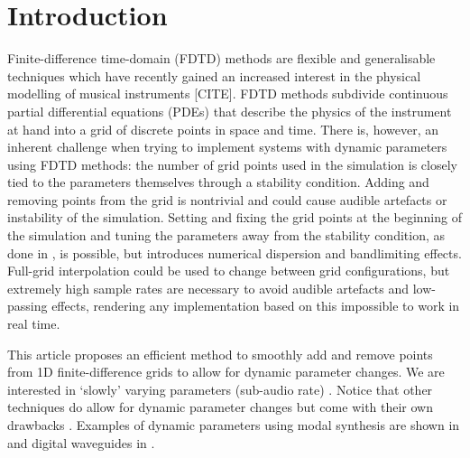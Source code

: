\section{Introduction}

Finite-difference time-domain (FDTD) methods are flexible and generalisable techniques which have recently gained an increased interest in the physical modelling of musical instruments [CITE]. %
FDTD methods subdivide continuous partial differential equations (PDEs) that describe the physics of the instrument at hand into a grid of discrete points in space and time. 
There is, however, an inherent challenge when trying to implement systems with dynamic parameters using FDTD methods: the number of grid points used in the simulation is closely tied to the parameters themselves through a stability condition.
Adding and removing points from the grid is nontrivial and could cause audible artefacts or instability of the simulation. Setting and fixing the grid points at the beginning of the simulation and tuning the parameters away from the stability condition, as done in \cite{Willemsen2019}, is possible, but introduces numerical dispersion and bandlimiting effects. Full-grid interpolation \cite[Ch. 5]{bilbao2009} could be used to change between grid configurations, but extremely high sample rates are necessary to avoid audible artefacts and low-passing effects, rendering any implementation based on this impossible to work in real time. 

This article proposes an efficient method to smoothly add and remove points from 1D finite-difference grids to allow for dynamic parameter changes. We are interested in `slowly' varying parameters (sub-audio rate) . Notice that other techniques do allow for dynamic parameter changes but come with their own drawbacks \cite{bilbao2009}. Examples of dynamic parameters using modal synthesis \cite{morrison1993mosaic} are shown in \cite{Mehes2016, Willemsen2017} and digital waveguides \cite{Smith1992} in \cite{Michon2014}. 

